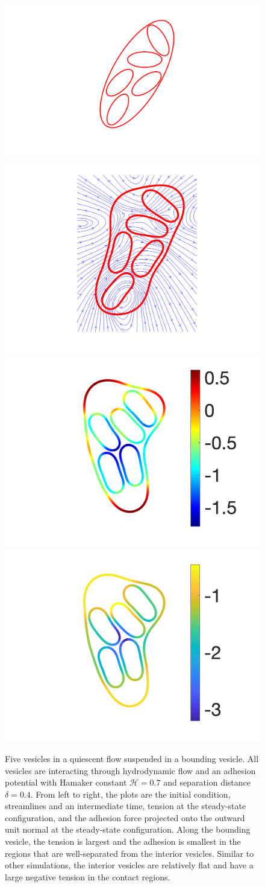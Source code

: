 \documentclass[prf,superscriptaddress,showpacs]{revtex4-1}
\begin{document}
\begin{figure}[htp]
\centering
\includegraphics[height=0.24\textwidth,trim={10cm 0cm 10cm 0cm},clip]{figs/relaxationManyVesInitialCondition.png}
\includegraphics[height=0.24\textwidth,trim={2cm 0cm 2cm 0cm},clip]{figs/relaxationManyVesStreamlines.png}
\includegraphics[height=0.24\textwidth,trim={2cm 0cm 1cm 0cm},clip]{figs/relaxationManyVesTension.png}
\includegraphics[height=0.24\textwidth,trim={2cm 0cm 2cm 0cm},clip]{figs/relaxationManyVesAdhesion.png}
\caption{\label{fig:relaxationManyVes} Five vesicles in a quiescent flow
suspended in a bounding vesicle.   All vesicles are interacting through hydrodynamic flow and
an adhesion potential with Hamaker constant $\mathcal{H} = 0.7$ and
separation distance $\delta = 0.4$.  From left to right, the plots are
the initial condition, streamlines and an intermediate time, tension at
the steady-state configuration, and the adhesion force projected onto
the outward unit normal at the steady-state configuration.  Along the
bounding vesicle, the tension is largest and the adhesion is smallest in
the regions that are well-separated from the interior vesicles.  Similar
to other simulations, the interior vesicles are relatively flat and have
a large negative tension in the contact regions.}
\end{figure}
\end{document}
